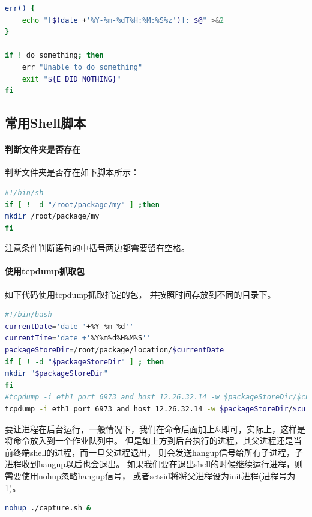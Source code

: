 \documentclass{book}
\begin{document}
\begin{lstlisting}[language=Bash]
err() {
	echo "[$(date +'%Y-%m-%dT%H:%M:%S%z')]: $@" >&2
}

if ! do_something; then
	err "Unable to do_something"
	exit "${E_DID_NOTHING}"
fi
\end{lstlisting}

\subsection{常用Shell脚本}

\paragraph{判断文件夹是否存在}判断文件夹是否存在如下脚本所示：

\begin{lstlisting}[language=Bash]
#!/bin/sh
if [ ! -d "/root/package/my" ] ;then
mkdir /root/package/my
fi
\end{lstlisting}

注意条件判断语句的中括号两边都需要留有空格。

\paragraph{使用tcpdump抓取包}如下代码使用tcpdump抓取指定的包，
并按照时间存放到不同的目录下。

\begin{lstlisting}[language=Bash]
#!/bin/bash
currentDate='date '+%Y-%m-%d''
currentTime='date +'%Y%m%d%H%M%S''
packageStoreDir=/root/package/location/$currentDate
if [ ! -d "$packageStoreDir" ] ; then
mkdir "$packageStoreDir"
fi
#tcpdump -i eth1 port 6973 and host 12.26.32.14 -w $packageStoreDir/$currentTime.cap
tcpdump -i eth1 port 6973 and host 12.26.32.14 -w $packageStoreDir/$currentTime.cap
\end{lstlisting}

要让进程在后台运行，一般情况下，我们在命令后面加上\&即可，实际上，这样是将命令放入到一个作业队列中。
但是如上方到后台执行的进程，其父进程还是当前终端shell的进程，而一旦父进程退出，
则会发送hangup信号给所有子进程，子进程收到hangup以后也会退出。
如果我们要在退出shell的时候继续运行进程，则需要使用nohup忽略hangup信号，
或者setsid将将父进程设为init进程(进程号为1)。

\begin{lstlisting}[language=Bash]
nohup ./capture.sh &
\end{lstlisting}
\end{document}

